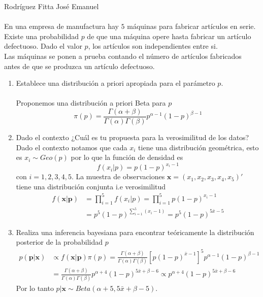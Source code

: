 \documentclass{article}
\begin{document}
Rodr\'iguez Fitta Jos\'e Emanuel \\ \\

En una empresa de manufactura hay $5$ m\'aquinas para fabricar art\'iculos en serie. Existe una probabilidad $p$ de que una m\'aquina opere hasta fabricar un art\'iculo defectuoso. Dado el valor $p$, los art\'iculos son independientes entre si. \\ 
Las m\'aquinas se ponen a prueba contando el n\'umero de art\'iculos fabricados antes de que se produzca un art\'iculo defectuoso.
\begin{enumerate}
\item Establece una distribuci\'on a priori apropiada para el par\'ametro $p$. \\ \\
Proponemos una distribuci\'on a priori Beta para $p$
\begin{equation*}
\pi (p ) = \frac{ \Gamma (\alpha + \beta )}{\Gamma (\alpha)\Gamma (\beta )  } p ^{\alpha -1}(1 - p )^{\beta -1}
\end{equation*}

\item Dado el contexto ¿Cu\'al es tu propuesta para la verosimilitud de los datos? \\ 
Dado el contexto notamos que cada $x_i$ tiene una distribuci\'on geom\'etrica, esto es $x_i \sim Geo(p)$ por lo que la funci\'on de densidad es
\begin{equation*}
f(x_i| p ) = p(1 - p)^{x_i -1}
\end{equation*}
con $i = 1,2,3,4,5$. La muestra de observaciones $\mathbf{x} = (x_1, x_2, x_3, x_4, x_5)'$ tiene una distribuci\'on conjunta i.e verosimilitud
\begin{align*}
f(\mathbf{x}| \mathbf{p}) &= \prod _ {i = 1} ^{5}f(x_i | p) = \prod _{i=1} ^5 p(1 - p)^{x_i -1} \\
& = p^5(1- p )^{\sum _{i = 1}^5 (x_i -1)} = p^5(1-p)^{5\bar{x} - 5} 
\end{align*}

\item Realiza una inferencia bayesiana para encontrar te\'oricamente la distribuci\'on posterior de la probabilidad $p$ \\
\begin{align*}
p(\mathbf{ p} | \mathbf{x} )  & \propto f(\mathbf{x} | \mathbf{ p}) \pi(p) =  \frac{ \Gamma (\alpha + \beta )}{\Gamma (\alpha)\Gamma (\beta )  } [ p(1-p)^{\bar{x} - 1} ] ^5 p ^{\alpha -1}(1 - p )^{\beta -1} \\
& =\frac{ \Gamma (\alpha + \beta )}{\Gamma (\alpha)\Gamma (\beta )  }  p ^{\alpha + 4} (1- p)^{5\bar{x} + \beta-6}
\propto p ^{\alpha + 4} (1- p)^{5\bar{x} + \beta-6}
\end{align*}
Por lo tanto $p | \mathbf{x} \sim Beta( \alpha + 5, 5\bar{x} + \beta - 5)$.


\end{enumerate}
\end{document}
